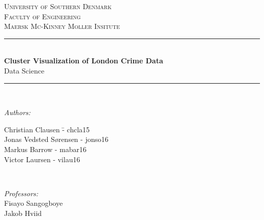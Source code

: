 \begin{titlepage}
\newcommand{\HRule}{\rule{\linewidth}{0.5mm}} %

\center %
 

\textsc{\LARGE University of Southern Denmark}\\[1.5cm] 
\textsc{\Large Faculty of Engineering}\\[0.5cm]
\textsc{\large Maersk Mc-Kinney Moller Insitute}\\[0.5cm] 


\HRule \\[0.4cm]
{ \huge \bfseries Cluster Visualization of London Crime Data}\\[0.4cm]
{\large  Data Science}
\HRule \\[1.5cm]
 



\begin{minipage}{0.4\textwidth}
    \begin{flushleft} \large
        \emph{Authors:}\\
        \begin{tabbing}
        
        Christian Clausen \hphantom{zzzzzzzzz} \=- chcla15\\
        Jonas Vedsted Sørensen \>- jonso16\\
        Markus Barrow \>- mabar16\\
        Victor Laursen \>- vilau16\\

        \end{tabbing}
        
    \end{flushleft}
\end{minipage}~
\begin{minipage}{0.4\textwidth}
    \begin{flushright} \large
        \emph{Professors:} \\
        Fisayo Sangogboye \\
        Jakob Hviid
    \end{flushright}
\end{minipage}\\[2cm]


\end{titlepage}
